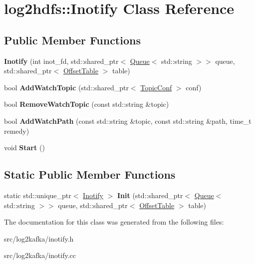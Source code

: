 \hypertarget{classlog2hdfs_1_1Inotify}{}\section{log2hdfs\+:\+:Inotify Class Reference}
\label{classlog2hdfs_1_1Inotify}
\subsection*{Public Member Functions}
\begin{DoxyCompactItemize}
\item 
{\bfseries Inotify} (int inot\+\_\+fd, std\+::shared\+\_\+ptr$<$ \hyperlink{classlog2hdfs_1_1Queue}{Queue}$<$ std\+::string $>$$>$ queue, std\+::shared\+\_\+ptr$<$ \hyperlink{classlog2hdfs_1_1OffsetTable}{Offset\+Table} $>$ table)\hypertarget{classlog2hdfs_1_1Inotify_ad34071284752c9a410b22acf8d3a3edd}{}\label{classlog2hdfs_1_1Inotify_ad34071284752c9a410b22acf8d3a3edd}

\item 
bool {\bfseries Add\+Watch\+Topic} (std\+::shared\+\_\+ptr$<$ \hyperlink{classlog2hdfs_1_1TopicConf}{Topic\+Conf} $>$ conf)\hypertarget{classlog2hdfs_1_1Inotify_a0d316fc6484ae37b0b12873e606ca4ab}{}\label{classlog2hdfs_1_1Inotify_a0d316fc6484ae37b0b12873e606ca4ab}

\item 
bool {\bfseries Remove\+Watch\+Topic} (const std\+::string \&topic)\hypertarget{classlog2hdfs_1_1Inotify_a4480eae9ea09fc9f195f2a08cb8ccd99}{}\label{classlog2hdfs_1_1Inotify_a4480eae9ea09fc9f195f2a08cb8ccd99}

\item 
bool {\bfseries Add\+Watch\+Path} (const std\+::string \&topic, const std\+::string \&path, time\+\_\+t remedy)\hypertarget{classlog2hdfs_1_1Inotify_a4e895da7dc26306f631e821beb4840c7}{}\label{classlog2hdfs_1_1Inotify_a4e895da7dc26306f631e821beb4840c7}

\item 
void {\bfseries Start} ()\hypertarget{classlog2hdfs_1_1Inotify_a7cefaa00dd6a0df4d0d2e43dbaccc453}{}\label{classlog2hdfs_1_1Inotify_a7cefaa00dd6a0df4d0d2e43dbaccc453}

\end{DoxyCompactItemize}
\subsection*{Static Public Member Functions}
\begin{DoxyCompactItemize}
\item 
static std\+::unique\+\_\+ptr$<$ \hyperlink{classlog2hdfs_1_1Inotify}{Inotify} $>$ {\bfseries Init} (std\+::shared\+\_\+ptr$<$ \hyperlink{classlog2hdfs_1_1Queue}{Queue}$<$ std\+::string $>$$>$ queue, std\+::shared\+\_\+ptr$<$ \hyperlink{classlog2hdfs_1_1OffsetTable}{Offset\+Table} $>$ table)\hypertarget{classlog2hdfs_1_1Inotify_a0b7430c48efb49c67554003ae0cd313a}{}\label{classlog2hdfs_1_1Inotify_a0b7430c48efb49c67554003ae0cd313a}

\end{DoxyCompactItemize}


The documentation for this class was generated from the following files\+:\begin{DoxyCompactItemize}
\item 
src/log2kafka/inotify.\+h\item 
src/log2kafka/inotify.\+cc\end{DoxyCompactItemize}

